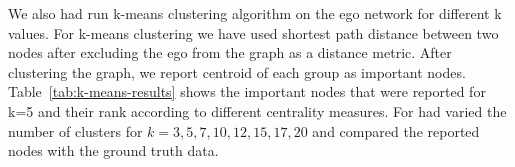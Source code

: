 We also had run k-means clustering algorithm on the ego network for
different k values.  For k-means clustering we have used shortest path
distance between two nodes after excluding the ego from the graph as a
distance metric.  After clustering the graph, we report centroid of
each group as important nodes.  Table~\ref{tab:k-means-results} shows
the important nodes that were reported for k=5 and their rank
according to different centrality measures.  For had varied the number
of clusters for $k=3,5,7,10,12,15,17,20$ and compared the reported
nodes with the ground truth data.

